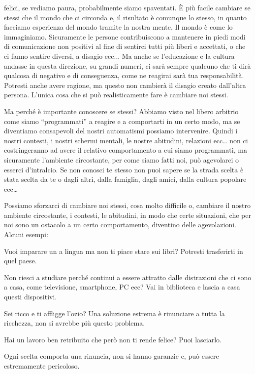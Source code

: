 \documentclass[12pt]{book} %
\begin{document}
felici, se vediamo paura, probabilmente siamo spaventati. È più facile cambiare se stessi che il mondo che ci circonda
e, il risultato è comunque lo stesso, in quanto facciamo esperienza del mondo tramite la nostra mente. Il mondo è come
lo immaginiamo. Sicuramente le persone contribuiscono a mantenere in piedi modi di comunicazione non positivi al fine
di sentirci tutti più liberi e accettati, o che ci fanno sentire diversi, a disagio ecc... Ma anche se l'educazione e
la cultura andasse in questa direzione, su grandi numeri, ci sarà sempre qualcuno che ti dirà qualcosa di negativo e di
conseguenza, come ne reagirai sarà tua responsabilità. Potresti anche avere ragione, ma questo non cambierà il disagio
creato dall'altra persona. L'unica cosa che si può realisticamente fare è
cambiare noi stessi.


\bigskip

Ma perché è importante conoscere se stessi? Abbiamo visto nel libero arbitrio come siamo “programmati” a reagire e a
comportarti in un certo modo, ma se diventiamo consapevoli del nostri automatismi possiamo intervenire. Quindi i nostri
contesti, i nostri schermi mentali, le nostre abitudini, relazioni ecc… non ci costringeranno ad avere il relativo
comportamento a cui siamo programmati, ma sicuramente l'ambiente circostante, per come siamo fatti
noi, può agevolarci o esserci d'intralcio. Se non conosci te stesso non puoi sapere se la strada
scelta è stata scelta da te o dagli altri, dalla famiglia, dagli amici, dalla cultura popolare ecc…

Possiamo sforzarci di cambiare noi stessi, cosa molto difficile o, cambiare il nostro ambiente circostante, i contesti,
le abitudini, in modo che certe situazioni, che per noi sono un ostacolo a un certo comportamento, diventino delle
agevolazioni. Alcuni esempi:

Vuoi imparare un a lingua ma non ti piace stare sui libri? Potresti trasferirti in quel paese.

Non riesci a studiare perché continui a essere attratto dalle distrazioni che ci sono a casa, come televisione,
smartphone, PC ecc? Vai in biblioteca e lascia a casa questi dispositivi.

Sei ricco e ti affligge l'ozio? Una soluzione estrema è rinunciare a tutta la ricchezza, non si
avrebbe più questo problema. 

Hai un lavoro ben retribuito che però non ti rende felice? Puoi lasciarlo.

Ogni scelta comporta una rinuncia, non si hanno garanzie e, può essere estremamente pericoloso. 
\end{document}
